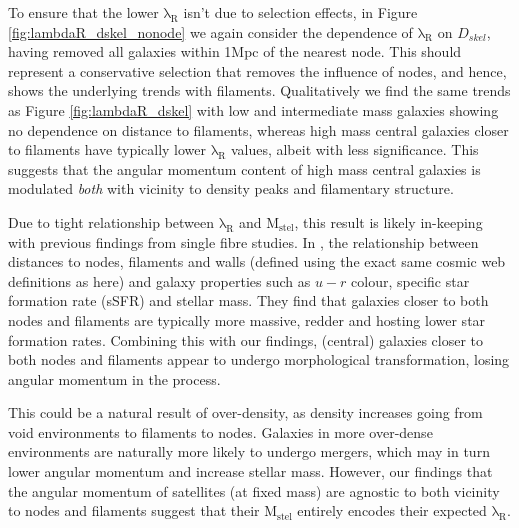 To ensure that the lower $\mathrm{\lambda_R}$ isn't due to selection effects, in Figure \ref{fig:lambdaR_dskel_nonode} we again consider the dependence of $\mathrm{\lambda_R}$ on $D_{skel}$, having removed all galaxies within 1Mpc of the nearest node. This should represent a conservative selection that removes the influence of nodes, and hence, shows the underlying trends with filaments. Qualitatively we find the same trends as Figure \ref{fig:lambdaR_dskel} with low and intermediate mass galaxies showing no dependence on distance to filaments, whereas high mass central galaxies closer to filaments have typically lower $\mathrm{\lambda_R}$ values, albeit with less significance. This suggests that the angular momentum content of high mass central galaxies is modulated \textit{both} with vicinity to density peaks and filamentary structure. 

Due to tight relationship between $\mathrm{\lambda_R}$ and $\mathrm{M_{stel}}$, this result is likely in-keeping with previous findings from single fibre studies. In \citet{kraljic2018}, the relationship between distances to nodes, filaments and walls (defined using the exact same cosmic web definitions as here) and galaxy properties such as $u - r$ colour, specific star formation rate (sSFR) and stellar mass. They find that galaxies closer to both nodes and filaments are typically more massive, redder and hosting lower star formation rates. Combining this with our findings, (central) galaxies closer to both nodes and filaments appear to undergo morphological transformation, losing angular momentum in the process.

This could be a natural result of over-density, as density increases going from void environments to filaments to nodes. Galaxies in more over-dense environments are naturally more likely to undergo mergers, which may in turn lower angular momentum and increase stellar mass. However, our findings that the angular momentum of satellites (at fixed mass) are agnostic to both vicinity to nodes and filaments suggest that their $\mathrm{M_{stel}}$ entirely encodes their expected $\mathrm{\lambda_R}$. 

